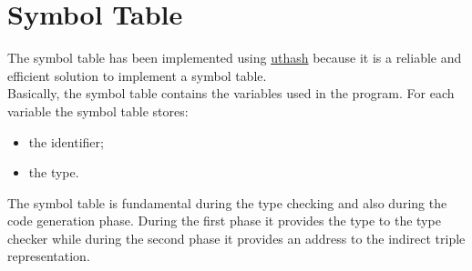 \section{Symbol Table}
The symbol table has been implemented using
\href{https://troydhanson.github.io/uthash/}{uthash} because it is a reliable
and efficient solution to implement a symbol table.
\\
Basically, the symbol table contains the variables used in the program.
For each variable the symbol table stores:
\begin{itemize}
	\item the identifier;
	\item the type.
\end{itemize}

The symbol table is fundamental during the type checking and also during the
code generation phase. During the first phase it provides the type to the
type checker while during the second phase it provides an address to the 
indirect triple representation.
